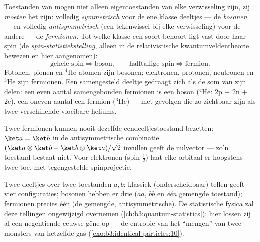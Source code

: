 \begin{theorem}\label{thm:b3:identical-particles:postulate}
Toestanden van  mogen niet alleen eigentoestanden van
elke verwisseling zijn, zij \emph{moeten} het zijn: volledig
\emph{symmetrisch} voor de ene klasse deeltjes --- de \emph{bosonen} ---
en volledig \emph{antisymmetrisch} (een tekenwissel bij elke
verwisseling) voor de andere --- de \emph{fermionen}. Tot welke klasse een
soort behoort ligt vast door haar spin (de
\emph{spin-statistiekstelling}, alleen in de relativistische
kwantumveldentheorie bewezen en hier aangenomen):
\[
\text{gehele spin} \Rightarrow \text{boson} , \qquad
\text{halftallige spin} \Rightarrow \text{fermion} .
\]
Fotonen, pionen en $^4$He-atomen zijn bosonen; elektronen, protonen,
neutronen en $^3$He zijn fermionen.
Een samengesteld deeltje gedraagt zich als de som van zijn delen: een
even aantal samengebonden fermionen is een boson ($^4$He: 2p + 2n + 2e),
een oneven aantal een fermion ($^3$He) --- met gevolgen die zo zichtbaar
zijn als twee verschillende vloeibare heliums.
\end{theorem}
\admitted

\begin{corollary}\label{cor:b3:identical-particles:pauli}
Twee fermionen kunnen nooit dezelfde eendeeltjestoestand bezetten:
$\ket a = \ket b$ in de antisymmetrische combinatie
$(\ket a\otimes\ket b - \ket b\otimes\ket a)/\sqrt2$ invullen geeft de
nulvector --- zo'n toestand bestaat niet. Voor elektronen (spin
$\tfrac12$) laat elke orbitaal er hoogstens twee toe, met tegengestelde
spinprojectie.
\end{corollary}

\begin{example}\label{ex:b3:identical-particles:counting}
Twee deeltjes over twee toestanden $a, b$: klassiek (onderscheidbaar)
tellen geeft vier configuraties; bosonen hebben er drie ($aa$, $bb$ en
\emph{één} gemengde toestand); fermionen precies één (de gemengde,
antisymmetrische). De statistische fysica zal deze tellingen ongewijzigd
overnemen (\cref{ch:b3:quantum-statistics}); hier lossen zij al een
negentiende-eeuwse gêne op --- de entropie van het ``mengen'' van twee
monsters van hetzelfde gas
(\cref{exo:b3:identical-particles:10}).
\end{example}

